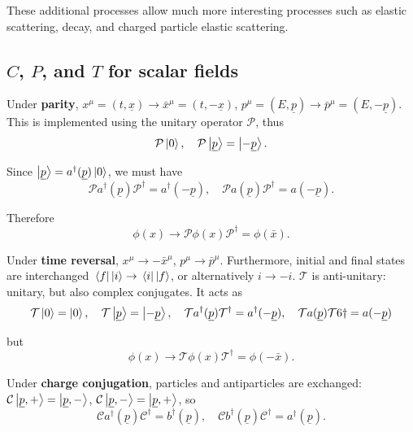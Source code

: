 \documentclass{article}
\begin{document}
These additional processes allow much more interesting processes such as elastic scattering, decay, and charged particle elastic scattering. 

\subsection{$C$, $P$, and $T$ for scalar fields}

Under \textbf{parity}, $x^\mu=(t,\underline{x}) \rightarrow \bar{x}^\mu = (t, -\underline{x})$, $p^\mu = (E, \underline{p}) \rightarrow \bar{p}^\mu = (E, -\underline{p})$. This is implemented using the unitary operator $\mathcal{P}$, thus
\begin{equation}
    \mathcal{P} \ket{0}, \quad \mathcal{P} \ket{\underline{p}} = \ket{-\underline{p}}.
\end{equation}

Since $\ket{\underline{p}} = a^\dagger(\underline{p})\ket{0}$, we must have
\begin{equation}
    \mathcal{P}a^\dagger(\underline{p})\mathcal{P}^\dagger = a^\dagger(-\underline{p}), \quad \mathcal{P}a(\underline{p})\mathcal{P}^\dagger = a(-\underline{p}).
\end{equation}

Therefore
\begin{equation}
    \phi(x) \rightarrow \mathcal{P} \phi(x) \mathcal{P}^\dagger = \phi(\bar{x}).
\end{equation}

Under \textbf{time reversal}, $x^\mu \rightarrow -\bar{x}^\mu$, $p^\mu \rightarrow \bar{p}^\mu$. Furthermore, initial and final states are interchanged $\mel{f}{\,}{i} \rightarrow \mel{i}{\,}{f}$, or alternatively $i \rightarrow -i$. $\mathcal{T}$ is anti-unitary: unitary, but also complex conjugates. It acts as 
\begin{equation}
    \mathcal{T}\ket{0} = \ket{0}, \quad \mathcal{T}\ket{\underline{p}} = \ket{-\underline{p}}, \quad \mathcal{T} a^\dagger(\underline{p})\mathcal{T}^\dagger = a^\dagger(-\underline{p}), \quad \mathcal{T}a(\underline{p})\mathcal{T}6 \dagger = a(-\underline{p})
\end{equation}

but
\begin{equation}
    \phi(x) \rightarrow \mathcal{T} \phi(x) \mathcal{T}^\dagger = \phi(-\bar{x}).
\end{equation}

Under \textbf{charge conjugation}, particles and antiparticles are exchanged: $\mathcal{C}\ket{\underline{p},+} = \ket{\underline{p},-}$, $\mathcal{C}\ket{\underline{p},-} = \ket{\underline{p},+}$, so 
\begin{equation}
    \mathcal{C}a^\dagger(\underline{p})\mathcal{C}^\dagger = b^\dagger(\underline{p}), \quad \mathcal{C}b^\dagger(\underline{p})\mathcal{C}^\dagger = a^\dagger(\underline{p}).
\end{equation}
\end{document}
